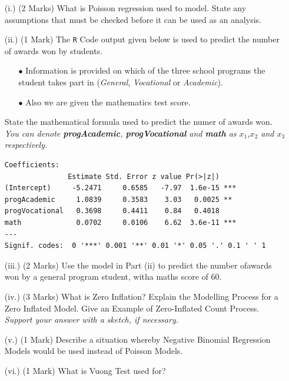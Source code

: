 \documentclass[a4paper,12pt]{article}
\begin{document}
\begin{itemize}
	\item[(i.)] (2 Marks)
	What is Poisson regression used to model. State any assumptions that must be checked before it can be used as an analysis.
%
	
	\item[(ii.)] (1 Mark) The \texttt{R} Code output given below is used to predict the number of awards won by students. \begin{itemize} 
		\item[$\bullet$] Information is provided on which of the three school programs the student takes part in (\textit{General}, \textit{Vocational} or \textit{Academic}). 
		\item[$\bullet$] Also we are given the mathematics test score.
		\end{itemize}
		State the mathematical formula used to predict the numer of awards won.\\
\textit{You can denote \textbf{progAcademic}, \textbf{progVocational} and \textbf{math} as $x_1$,$x_2$ and $x_3$ respectively.}


\begin{framed}
\begin{verbatim}
Coefficients:
               Estimate Std. Error z value Pr(>|z|)    
(Intercept)     -5.2471     0.6585   -7.97  1.6e-15 ***
progAcademic     1.0839     0.3583    3.03   0.0025 ** 
progVocational   0.3698     0.4411    0.84   0.4018    
math             0.0702     0.0106    6.62  3.6e-11 ***
---
Signif. codes:  0 '***' 0.001 '**' 0.01 '*' 0.05 '.' 0.1 ' ' 1

\end{verbatim}
\end{framed}
	
	\item[(iii.)] (2 Marks) Use the model in Part (ii) to predict the number ofawards won by a general program student, witha maths score of 60.
	

	\item[(iv.)] (3 Marks)
	What is Zero Inflation? Explain the Modelling Process for a Zero Inflated Model. Give an Example of Zero-Inflated Count Process. \textit{Support your answer with a sketch, if necessary.	}
	

	\item[(v.)] (1 Mark) Describe a situation whereby Negative Binomial Regression Models would be used instead of Poisson Models.
	

	
	\item[(vi.)] (1 Mark) What is Vuong Test used for?
\end{itemize}
\end{document}
